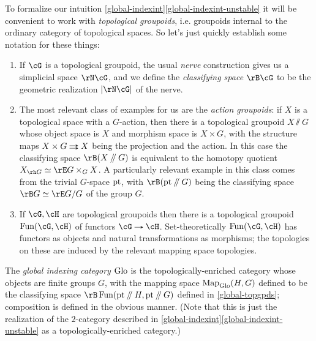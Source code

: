 \begin{notation}
  \label{global-topgpds}
  To formalize our intuition
  \cref{global-indexint}\cref{global-indexint-unstable} it will be
  convenient to work with \emph{topological groupoids}, i.e. groupoids
  internal to the ordinary category of topological spaces. So let's
  just quickly establish some notation for these things:
  \begin{enumerate}
  \item If $\cG$ is a topological groupoid, the usual \emph{nerve}
    construction gives us a simplicial space $\rN\cG$, and we define
    the \emph{classifying space} $\rB\cG$ to be the geometric
    realization $|\rN\cG|$ of the nerve.
  \item The most relevant class of examples for us are the
    \emph{action groupoids}: if $X$ is a topological space with a
    $G$-action, then there is a topological groupoid $X \sslash G$
    whose object space is $X$ and morphism space is $X \times G$, with
    the structure maps $X \times G \doubto X$ being the projection and
    the action. In this case the classifying space $\rB(X \sslash G)$
    is equivalent to the homotopy quotient
    $X_{\rh G} \iso \rE G \times_G X$. A particularly relevant example
    in this class comes from the trivial $G$-space $\mathrm{pt}$, with
    $\rB(\pt \sslash G)$ being the classifying space
    $\rB G \iso \rE G/G$ of the group $G$.
  \item If $\cG,\cH$ are topological groupoids then there is a
    topological groupoid $\Fun(\cG,\cH)$ of functors $\cG \to \cH$.
    Set-theoretically $\Fun(\cG,\cH)$ has functors as objects and
    natural transformations as morphisms; the topologies on these are
    induced by the relevant mapping space topologies.
  \end{enumerate}
\end{notation}

\begin{definition}
  \label{global-indexcat-dfn}
  The \emph{global indexing category} $\mathrm{Glo}$ is the
  topologically-enriched category whose objects are finite groups $G$,
  with the mapping space $\operatorname{Map}_{\mathrm{Glo}}(H,G)$ defined to be the
  classifying space $\rB \Fun(\pt \sslash H, \pt \sslash G)$ defined
  in \cref{global-topgpds}; composition is defined in the obvious
  manner. (Note that this is just the realization of the $2$-category
  described in \cref{global-indexint}\cref{global-indexint-unstable}
  as a topologically-enriched category.)
\end{definition}

